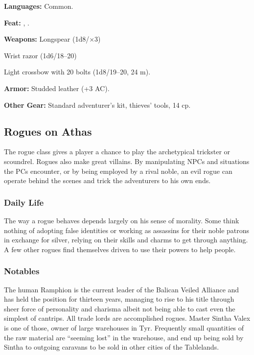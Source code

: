 \textbf{Languages:} Common.

\textbf{Feat:} , .

\textbf{Weapons:} Longspear (1d8/$\times$3)

Wrist razor (1d6/18--20)

Light crossbow with 20 bolts (1d8/19--20, 24 m).

\textbf{Armor:} Studded leather (+3 AC).

\textbf{Other Gear:} Standard adventurer's kit, thieves' tools, 14 cp.

\subsection{Rogues on Athas}

The rogue class gives a player a chance to play the archetypical trickster or scoundrel. Rogues also make great villains. By manipulating NPCs and situations the PCs encounter, or by being employed by a rival noble, an evil rogue can operate behind the scenes and trick the adventurers to his own ends.

\subsubsection{Daily Life}
The way a rogue behaves depends largely on his sense of morality. Some think nothing of adopting false identities or working as assassins for their noble patrons in exchange for silver, relying on their skills and charms to get through anything. A few other rogues find themselves driven to use their powers to help people.

\subsubsection{Notables}
The human Ramphion is the current leader of the Balican Veiled Alliance and has held the position for thirteen years, managing to rise to his title through sheer force of personality and charisma albeit not being able to cast even the simplest of cantrips. All trade lords are accomplished rogues. Master Sintha Valex is one of those, owner of large warehouses in Tyr. Frequently small quantities of the raw material are ``seeming lost'' in the warehouse, and end up being sold by Sintha to outgoing caravans to be sold in other cities of the Tablelands.

